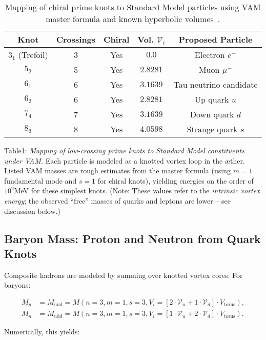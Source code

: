 \begin{table}[H]
\centering
\begin{tabular}{|c|c|c|c|c|}
\hline
\textbf{Knot} & \textbf{Crossings} & \textbf{Chiral} & \textbf{Vol.} $\mathcal{V}_i$ & \textbf{Proposed Particle} \\
\hline
$3_1$ (Trefoil)   & 3 & Yes  & $0.0$     & Electron $e^-$ \\
$5_2$             & 5 & Yes  & $2.8281$  & Muon $\mu^-$ \\
$6_1$             & 6 & Yes  & $3.1639$  & Tau neutrino candidate \\
$6_2$             & 6 & Yes  & $2.8281$  & Up quark $u$ \\
$7_4$             & 7 & Yes  & $3.1639$  & Down quark $d$ \\
$8_6$             & 8 & Yes  & $4.0598$  & Strange quark $s$ \\
\hline
\end{tabular}
\caption{Mapping of chiral prime knots to Standard Model particles using VAM master formula and known hyperbolic volumes~\cite{KnotAtlas}.}
\label{tab:knot_to_particle}
\end{table}


Table1: \textit{Mapping of low-crossing prime knots to Standard Model constituents under VAM.} Each particle is modeled as a knotted vortex loop in the æther. Listed VAM masses are rough estimates from the master formula (using $m=1$ fundamental mode and $s=1$ for chiral knots), yielding energies on the order of $10^2$MeV for these simplest knots. (Note: These values refer to the \textit{intrinsic vortex energy}; the observed “free” masses of quarks and leptons are lower – see discussion below.)


\subsection{Baryon Mass: Proton and Neutron from Quark Knots}

Composite hadrons are modeled by summing over knotted vortex cores. For baryons:

\begin{align}
M_p &= M_{\text{uud}} = M(n=3, m=1, s=3, V_i = [2\cdot \mathcal{V}_u + 1 \cdot \mathcal{V}_d]\cdot V_{\text{torus}}), \\
M_n &= M_{\text{udd}} = M(n=3, m=1, s=3, V_i = [1\cdot \mathcal{V}_u + 2 \cdot \mathcal{V}_d]\cdot V_{\text{torus}}).
\end{align}

Numerically, this yields:

